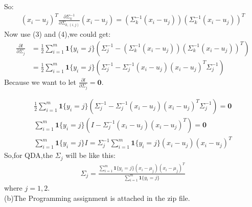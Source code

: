 \documentclass[a4paper]{article}
\begin{document}
So:
\begin{align}
(x_i-u_j)^T\frac{\partial \Sigma_k^{-1}}{\partial \Sigma_{k,(i,j)}}(x_i-u_j) = (\Sigma_k^{-1}(x_i-u_j)) (\Sigma_k^{-1}(x_i-u_j))^T
\end{align}
Now use (3) and (4),we could get: 
\begin{equation*}
\begin{aligned}
\frac{\partial l}{\partial \Sigma_j} &=\frac 1 2\sum_{i=1}^m \mathbf{1}\{y_i=j\} (\Sigma_j ^{-1}-   (\Sigma_k^{-1}(x_i-u_j)) (\Sigma_k^{-1}(x_i-u_j))^T)\\
 &=\frac 1 2\sum_{i=1}^m \mathbf{1}\{y_i=j\} (\Sigma_j ^{-1}-   \Sigma_j^{-1}(x_i-u_j)(x_i-u_j)^T\Sigma_j^{-1})
\end{aligned}
\end{equation*}
Because we want to let $\frac{\partial l}{\partial \Sigma_j} = \mathbf{0}$.

\begin{equation*}
\begin{aligned}
\frac 1 2\sum_{i=1}^m  \mathbf{1}\{y_i=j\} (\Sigma_j ^{-1}-   \Sigma_j^{-1}(x_i-u_j)(x_i-u_j)^T\Sigma_j^{-1}) = \mathbf{0}\\
\sum_{i=1}^m\mathbf{1}\{y_i=j\} (I - \Sigma_j^{-1}(x_i-u_j)(x_i-u_j)^T) = \mathbf{0}\\
\sum_{i=1}^m\mathbf{1}\{y_i=j\} I = \Sigma_j^{-1}\sum_{i=1}^m \mathbf{1}\{y_i=j\}(x_i-u_j)(x_i-u_j)^T
\end{aligned}
\end{equation*}
So,for QDA,the $\Sigma_j$ will be like this:
\begin{equation*}
\begin{aligned}
\Sigma_j = \frac{\sum_{i=1}^m \mathbf{1}\{y_i=j\}(x_i - \mu_{j}) (x_i - \mu_{j})^T}{\sum_{i=1}^m \mathbf{1}\{y_i=j\}}
\end{aligned}
\end{equation*}
where $j=1,2$.
$$$$
(b)The Programming assignment is attached in the zip file.
\end{document}
